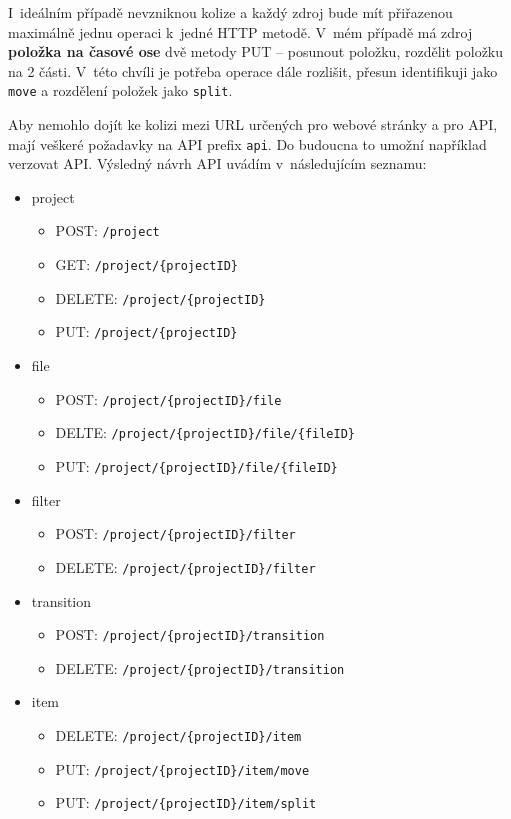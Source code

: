 I~ideálním případě nevzniknou kolize a každý zdroj bude mít přiřazenou maximálně jednu operaci k~jedné HTTP metodě. V~mém případě má zdroj \textbf{položka na časové ose} dvě metody PUT -- posunout položku, rozdělit položku na 2 části. V~této chvíli je potřeba operace dále rozlišit, přesun identifikuji jako \texttt{move} a rozdělení položek jako \texttt{split}.

Aby nemohlo dojít ke kolizi mezi URL určených pro webové stránky a pro API, mají veškeré požadavky na API prefix \texttt{api}. Do budoucna to umožní například verzovat API. Výsledný návrh API uvádím v~následujícím seznamu:
\begin{itemize}
\item project
\begin{itemize}
\item POST: \texttt{/project}
\item GET: \texttt{/project/\{projectID\}}
\item DELETE: \texttt{/project/\{projectID\}}
\item PUT: \texttt{/project/\{projectID\}}
\end{itemize}
\item file
\begin{itemize}
\item POST: \texttt{/project/\{projectID\}/file}
\item DELTE: \texttt{/project/\{projectID\}/file/\{fileID\}}
\item PUT: \texttt{/project/\{projectID\}/file/\{fileID\}}
\end{itemize}
\item filter
\begin{itemize}
\item POST: \texttt{/project/\{projectID\}/filter}
\item DELETE: \texttt{/project/\{projectID\}/filter}
\end{itemize}
\item transition
\begin{itemize}
\item POST: \texttt{/project/\{projectID\}/transition}
\item DELETE: \texttt{/project/\{projectID\}/transition}
\end{itemize}
\item item
\begin{itemize}
\item DELETE: \texttt{/project/\{projectID\}/item}
\item PUT: \texttt{/project/\{projectID\}/item/move}
\item PUT: \texttt{/project/\{projectID\}/item/split}
\end{itemize}
\end{itemize}

